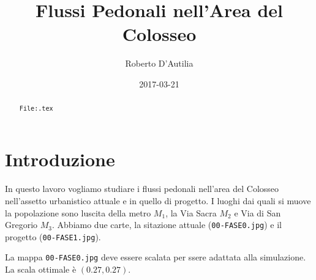 \documentclass[]{article}
\title{Flussi Pedonali nell'Area del Colosseo}
\author{Roberto D'Autilia}
\date{2017-03-21}
\begin{document}
\lstset{
	language=C,                             %
	basicstyle=\ttfamily,                   %
	breaklines=true,
	columns=flexible,                       %
}

\ifpdf
{}
\else
{}
\fi

\maketitle


\begin{abstract}
{\tt File:\jobname.tex}\\
\end{abstract}

\section{Introduzione}
In questo lavoro vogliamo studiare i flussi pedonali nell'area del Colosseo nell'assetto urbanistico attuale e in quello di progetto.
I luoghi dai quali si muove la popolazione sono luscita della metro $M_1$, la Via Sacra $M_2$ e Via di San Gregorio $M_3$.
Abbiamo due carte, la sitazione attuale ({\tt 00-FASE0.jpg}) e il progetto ({\tt 00-FASE1.jpg}).

La mappa {\tt 00-FASE0.jpg} deve essere scalata per ssere adattata alla simulazione.
La scala ottimale è $(0.27,0.27)$.
\end{document}
